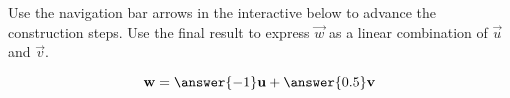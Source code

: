 \documentclass{ximera}
\author{Anna Davis}
\begin{document}
\begin{exercise}
Use the navigation bar arrows in the interactive below to advance the construction steps.  Use the final result to express $\vec{w}$ as a linear combination of $\vec{u}$ and $\vec{v}$.

 
\begin{onlineOnly}
\begin{center}
\end{center}
\end{onlineOnly}

$$\vec{w}=\answer{-1}\vec{u}+\answer{0.5}\vec{v}$$
\end{exercise}
\end{document}
